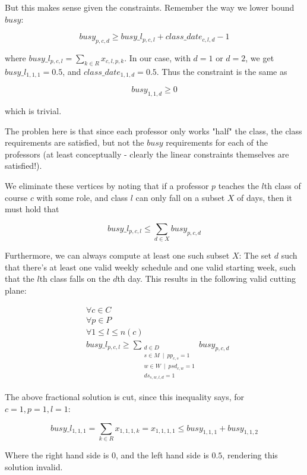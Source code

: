 But this makes sense given the constraints. Remember the way we lower bound $busy$:

$$
busy_{p, c, d} \ge busy\_l_{p, c, l} + class\_date_{c, l, d} - 1
$$

where $busy\_l_{p, c, l} = \sum_{k \in R} x_{c, l, p, k}$. In our case, with $d = 1$ or $d = 2$, we get $busy\_l_{1, 1, 1} = 0.5$, and $class\_date_{1, 1, d} = 0.5$. Thus the constraint is the same as

$$
busy_{1, 1, d} \ge 0
$$

which is trivial.

The problen here is that since each professor only works "half" the class, the class requirements are satisfied, but not the $busy$ requirements for each of the professors (at least conceptually - clearly the linear constraints themselves are satisfied!). 

We eliminate these vertices by noting that if a professor $p$ teaches the $l$th class of course $c$ with some role, and class $l$ can only fall on a subset $X$ of days, then it must hold that

$$
busy\_l_{p, c, l} \le \sum_{d \in X} busy_{p, c, d}
$$

Furthermore, we can always compute at least one such subset $X$: The set $d$ such that there's at least one valid weekly schedule and one valid starting week, such that the $l$th class falls on the $d$th day. This results in the following valid cutting plane:

\begin{align*}
&\forall c \in C\\
&\forall p \in P\\
&\forall 1 \le l \le n(c)\\
&busy\_l_{p, c, l} \ge \sum_{\substack{d \in D \\ s \in M\ \mid\ pp_{c, s} = 1\\ w \in W\ \mid\ psd_{c, w} = 1 \\ ds_{s, w, l, d} = 1}} busy_{p, c, d}
\end{align*}

The above fractional solution is cut, since this inequality says, for $c = 1, p = 1, l = 1$:

$$
busy\_l_{1, 1, 1} = \sum_{k \in R} x_{1, 1, 1, k} = x_{1, 1, 1, 1} \le busy_{1, 1, 1} + busy_{1, 1, 2}
$$

Where the right hand side is $0$, and the left hand side is $0.5$, rendering this solution invalid.
